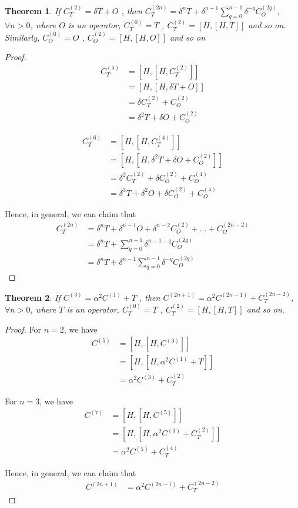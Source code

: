 \documentclass[11pt,a4paper]{article}
\newtheorem{thm}{Theorem}
\begin{document}
\begin{thm}
If $C^{(2)}_T=  \delta T + O$ , then $C^{(2n)}_T= \delta^{n} T +  \delta^{n-1} \sum_{q=0}^{n-1} \delta^{-q} C^{(2q)}_O  $, $\forall n>0$,  where $O$ is an operator,  $ C^{(0)}_T=T$ , $C^{(2)}_T=[H, [H, T]]$ and so on. Similarly,  $ C^{(0)}_O=O$ , $C^{(2)}_O=[H, [H, O]]$ and so on
\end{thm}


\begin{proof}

\begin{align}
C^{(4)}_T &= [H,[H,C^{(2)}_T]]\\
&=[H,[H, \delta T + O ]] \\
&=\delta C^{(2)}_T + C^{(2)}_O \\
&=\delta^2 T +\delta O + C^{(2)}_O
\end{align}

\begin{align}
C^{(6)}_T &= [H,[H,C^{(4)}_T]]\\
&=[H,[H, \delta^2 T +\delta O + C^{(2)}_O ]] \\
&=\delta^2 C^{(2)}_T + \delta C^{(2)}_O + C^{(4)}_O \\
&=\delta^3 T +\delta^2 O + \delta C^{(2)}_O + C^{(4)}_O
\end{align}

Hence, in general, we can claim that 
\begin{align*}
C^{(2n)}_T &=\delta^{n} T + \delta^{n-1} O + \delta^{n-2}  C^{(2)}_O + \ldots +    C^{(2n-2)}_O \\
&=\delta^{n} T + \sum_{q=0}^{n-1} \delta^{n-1-q}C^{(2q)}_O \\
&=\delta^{n} T +  \delta^{n-1} \sum_{q=0}^{n-1} \delta^{-q} C^{(2q)}_O 
\end{align*}

\end{proof}

\begin{thm}
If $C^{(3)}=  \alpha^2  C^{(1)} + T$ , then $C^{(2n+1)}= \alpha^2  C^{(2n-1)} +C^{(2n-2)}_{T}$, $\forall n>0$,  where $T$ is an operator,  $ C^{(0)}_T=T$ , $C^{(2)}_T=[H, [H, T]]$ and so on.
\end{thm}



\begin{proof}
For $n =2$, we have
\begin{align}
C^{(5)} &= [H,[H,C^{(3)}]]\\
&=[H,[H, \alpha^2  C^{(1)} + T ]] \\
&=\alpha^2 C^{(3)}+  C^{(2)}_T
\end{align}

For $n =3$, we have
\begin{align}
C^{(7)} &= [H,[H,C^{(5)}]]\\
&=[H,[H, \alpha^2 C^{(3)}+  C^{(2)}_T ]] \\
&=\alpha^2 C^{(5)} +  C^{(4)}_T
\end{align}

Hence, in general, we can claim that 
\begin{align*}
C^{(2n+1)} &=\alpha^2  C^{(2n-1)} +C^{(2n-2)}_{T}
\end{align*}
\end{proof}
\end{document}
